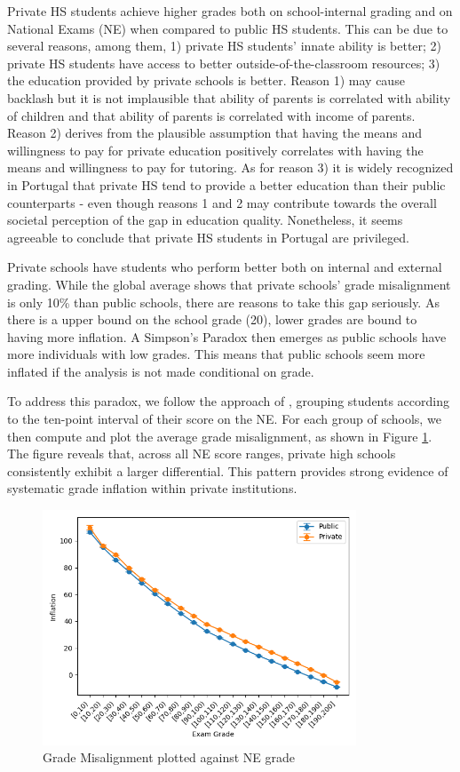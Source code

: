 \documentclass{article}
\begin{document}
Private HS students achieve higher grades both on school-internal grading and on National Exams (NE) when compared to public HS students. This can be due to several reasons, among them, 1) private HS students' innate ability is better; 2) private HS students have access to better outside-of-the-classroom resources; 3) the education provided by private schools is better. Reason 1) may cause backlash but it is not implausible that ability of parents is correlated with ability of children and that ability of parents is correlated with income of parents. Reason 2) derives from the plausible assumption that having the means and willingness to pay for private education positively correlates with having the means and willingness to pay for tutoring. As for reason 3) it is widely recognized in Portugal that private HS tend to provide a better education than their public counterparts - even though reasons 1 and 2 may contribute towards the overall societal perception of the gap in education quality.
Nonetheless, it seems agreeable to conclude that private HS students in Portugal are privileged. 


Private schools have students who perform better both on internal and external grading. While the global average shows that private schools' grade misalignment is only 10\% than public schools, there are reasons to take this gap seriously. As there is a upper bound on the school grade (20), lower grades are bound to having more inflation. A Simpson's Paradox then emerges as public schools have more individuals with low grades. This means that public schools seem more inflated if the analysis is not made conditional on grade.


To address this paradox, we follow the approach of \cite{nata2014unfairness}, grouping students according to the ten-point interval of their score on the NE. For each group of schools, we then compute and plot the average grade misalignment, as shown in Figure \ref{fig:inflacao_bins_pub_priv_en}. The figure reveals that, across all NE score ranges, private high schools consistently exhibit a larger differential. This pattern provides strong evidence of systematic grade inflation within private institutions.


\begin{figure}[ht]
  \centering
  \includegraphics[height=7cm, keepaspectratio]{Figures/inflacao_bins_pub_priv_en.png}
  \caption{Grade Misalignment plotted against NE grade }
  \label{fig:inflacao_bins_pub_priv_en}
\end{figure}
\end{document}
